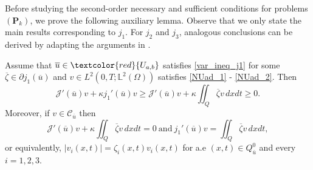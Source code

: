\documentclass[reqno]{amsart}
\begin{document}
	Before studying the second-order necessary and sufficient conditions for problems $(\textbf{P}_k)$, we prove the following auxiliary lemma. Observe that we only state the main results corresponding to $j_1$. For $j_2$ and $j_3$, analogous conclusions can be derived by adapting the arguments in \cite{CHW2017}.
	\begin{lemma} \label{5.1}
		Assume that $\overline{u} \in \textcolor{red}{U_{a,b}} $ satisfies \eqref{var_ineq_j1} for some $\overline{\zeta} \in \partial j_1(\overline{u})$ and $v\in L^2(0,T;\mathbb{L}^2(\Omega))$ satisfies \eqref{NUad_1} - \eqref{NUad_2}. Then
		\begin{equation*}
			\mathcal{J}'(\overline{u})v + \kappa j_1'(\overline{u})v \geq \mathcal{J}'(\overline{u})v + \kappa \iint_Q \overline{\zeta}v \, dxdt  \geq 0.
		\end{equation*}
		Moreover, if $v \in \mathcal{C}_{\overline{u}}$ then 
		\begin{equation}
			\mathcal{J}'(\overline{u})v + \kappa \iint_Q \overline{\zeta}v \, dxdt = 0 \ \text{and} \ j_1'(\overline{u})v=\iint_Q \overline{\zeta}v \, dxdt,\label{lem5.1}
		\end{equation}
		or equivalently, $\displaystyle \vert v_i(x,t)\vert = \zeta_i(x,t) v_i(x,t)$ for a.e $(x,t) \in Q_{\bar{u}}^0$ and every $i=1,2,3$.
	\end{lemma}
\end{document}
